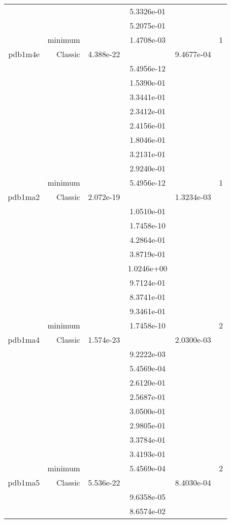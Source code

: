 \begin{xltabular}{\textwidth}{r|rS[table-format=1.3e+2]S[table-format=1.4e+2]S[table-format=1.4e+2]S[table-format=-1.5]}
&  &  & 5.3326e-01 & & \\
&  &  & 5.2075e-01 & & \\
& minimum &  & 1.4708e-03 & & 1 \\  \addlinespace
pdb1m4e & Classic & 4.388e-22 &  & 9.4677e-04 & \\
&  &  & 5.4956e-12 & & \\
&  &  & 1.5390e-01 & & \\
&  &  & 3.3441e-01 & & \\
&  &  & 2.3412e-01 & & \\
&  &  & 2.4156e-01 & & \\
&  &  & 1.8046e-01 & & \\
&  &  & 3.2131e-01 & & \\
&  &  & 2.9240e-01 & & \\
& minimum &  & 5.4956e-12 & & 1 \\  \addlinespace
pdb1ma2 & Classic & 2.072e-19 &  & 1.3234e-03 & \\
&  &  & 1.0510e-01 & & \\
&  &  & 1.7458e-10 & & \\
&  &  & 4.2864e-01 & & \\
&  &  & 3.8719e-01 & & \\
&  &  & 1.0246e+00 & & \\
&  &  & 9.7124e-01 & & \\
&  &  & 8.3741e-01 & & \\
&  &  & 9.3461e-01 & & \\
& minimum &  & 1.7458e-10 & & 2 \\  \addlinespace
pdb1ma4 & Classic & 1.574e-23 &  & 2.0300e-03 & \\
&  &  & 9.2222e-03 & & \\
&  &  & 5.4569e-04 & & \\
&  &  & 2.6120e-01 & & \\
&  &  & 2.5687e-01 & & \\
&  &  & 3.0500e-01 & & \\
&  &  & 2.9805e-01 & & \\
&  &  & 3.3784e-01 & & \\
&  &  & 3.4193e-01 & & \\
& minimum &  & 5.4569e-04 & & 2 \\  \addlinespace
pdb1ma5 & Classic & 5.536e-22 &  & 8.4030e-04 & \\
&  &  & 9.6358e-05 & & \\
&  &  & 8.6574e-02 & & \\

\end{xltabular}
